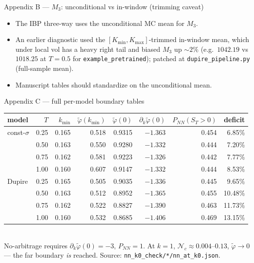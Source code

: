 \documentclass[aspectratio=169,11pt]{beamer}
\newcommand{\gold}[1]{{\color{ntugold}#1}}
\begin{document}
\begin{frame}{Appendix B --- $M_3$: unconditional vs in-window (trimming caveat)}
  \begin{itemize}\small
    \item The IBP three-way uses the \gold{unconditional} MC mean for $M_3$.
    \item An earlier diagnostic used the $[K_{\min},K_{\max}]$-trimmed in-window mean, which under
          local vol has a heavy right tail and biased $M_3$ up $\sim2\%$
          (e.g.\ $1042.19$ vs $1018.25$ at $T{=}0.5$ for \texttt{example\_pretrained}); patched at
          \texttt{dupire\_pipeline.py} (full-sample mean).
    \item Manuscript tables should standardize on the unconditional mean.
  \end{itemize}
\end{frame}

\begin{frame}{Appendix C --- full per-model boundary tables}
  \scriptsize\centering
  \begin{tabular}{l r r r r r r r}
    \toprule
    model & $T$ & $k_{\min}$ & $\tilde\varphi(k_{\min})$ & $\tilde\varphi(0)$ &
      $\partial_k\tilde\varphi(0)$ & $P_{NN}(S_T{>}0)$ & deficit\\
    \midrule
    const-$\sigma$ & 0.25 & 0.165 & 0.518 & 0.9315 & $-1.363$ & 0.454 & 6.85\%\\
                   & 0.50 & 0.163 & 0.550 & 0.9280 & $-1.332$ & 0.444 & 7.20\%\\
                   & 0.75 & 0.162 & 0.581 & 0.9223 & $-1.326$ & 0.442 & 7.77\%\\
                   & 1.00 & 0.160 & 0.607 & 0.9147 & $-1.332$ & 0.444 & 8.53\%\\
    \midrule
    Dupire & 0.25 & 0.165 & 0.505 & 0.9035 & $-1.336$ & 0.445 & 9.65\%\\
           & 0.50 & 0.163 & 0.512 & 0.8952 & $-1.365$ & 0.455 & 10.48\%\\
           & 0.75 & 0.162 & 0.522 & 0.8827 & $-1.390$ & 0.463 & 11.73\%\\
           & 1.00 & 0.160 & 0.532 & 0.8685 & $-1.406$ & 0.469 & 13.15\%\\
    \bottomrule
  \end{tabular}
  \vspace{0.4em}\\
  {\footnotesize No-arbitrage requires $\partial_k\tilde\varphi(0)=-3$, $P_{NN}=1$. At $k{=}1$,
  $\mathcal{N}_c\approx0.004$--$0.13$, $\tilde\varphi\to0$ --- the far boundary \emph{is} reached.
  Source: \texttt{nn\_k0\_check/*/nn\_at\_k0.json}.}
\end{frame}
\end{document}
